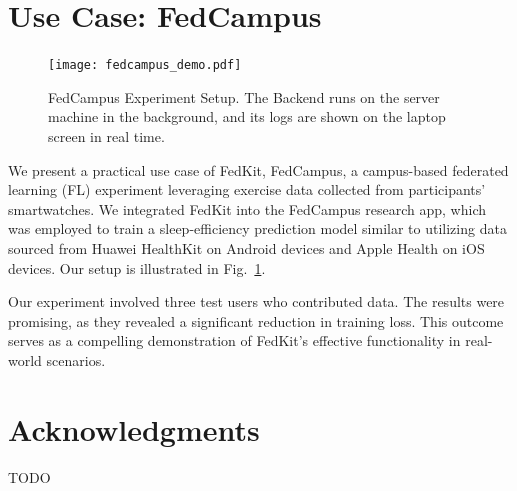 \documentclass[letterpaper]{article} %
\begin{document}
\section{Use Case: FedCampus}

\begin{figure}
    \centering
    \texttt{[image: fedcampus\_demo.pdf]}
    \caption{FedCampus Experiment Setup.
        The Backend runs on the server machine in the background,
        and its logs are shown on the laptop screen in real time.}
    \label{fig:fedcampus}
\end{figure}

We present a practical use case of FedKit, FedCampus,
a campus-based federated learning (FL) experiment leveraging
exercise data collected from participants' smartwatches.
We integrated FedKit into the FedCampus research app,
which was employed to train a sleep-efficiency prediction model similar to
\cite{khoa2022fedmcrnn}
utilizing data sourced from Huawei HealthKit on Android devices and
Apple Health on iOS devices.
Our setup is illustrated in Fig.~\ref{fig:fedcampus}.

Our experiment involved three test users who contributed data.
The results were promising,
as they revealed a significant reduction in training loss.
This outcome serves as a compelling demonstration of FedKit's
effective functionality in real-world scenarios.

\appendix

\section*{Acknowledgments}
TODO

\bigskip


\end{document}
